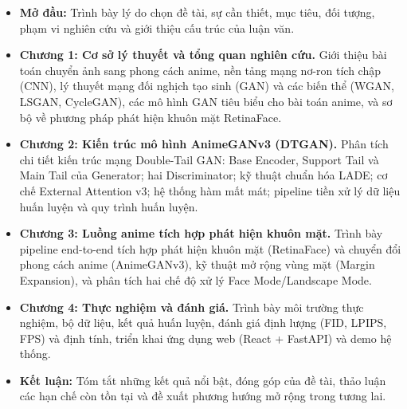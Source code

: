 \begin{itemize}
    \item \textbf{Mở đầu:} Trình bày lý do chọn đề tài, sự cần thiết, mục tiêu, đối tượng, phạm vi nghiên cứu và giới thiệu cấu trúc của luận văn.
    \item \textbf{Chương 1: Cơ sở lý thuyết và tổng quan nghiên cứu.} Giới thiệu bài toán chuyển ảnh sang phong cách anime, nền tảng mạng nơ-ron tích chập (CNN), lý thuyết mạng đối nghịch tạo sinh (GAN) và các biến thể (WGAN, LSGAN, CycleGAN), các mô hình GAN tiêu biểu cho bài toán anime, và sơ bộ về phương pháp phát hiện khuôn mặt RetinaFace.
    \item \textbf{Chương 2: Kiến trúc mô hình AnimeGANv3 (DTGAN).} Phân tích chi tiết kiến trúc mạng Double-Tail GAN: Base Encoder, Support Tail và Main Tail của Generator; hai Discriminator; kỹ thuật chuẩn hóa LADE; cơ chế External Attention v3; hệ thống hàm mất mát; pipeline tiền xử lý dữ liệu huấn luyện và quy trình huấn luyện.
    \item \textbf{Chương 3: Luồng anime tích hợp phát hiện khuôn mặt.} Trình bày pipeline end-to-end tích hợp phát hiện khuôn mặt (RetinaFace) và chuyển đổi phong cách anime (AnimeGANv3), kỹ thuật mở rộng vùng mặt (Margin Expansion), và phân tích hai chế độ xử lý Face Mode/Landscape Mode.
    \item \textbf{Chương 4: Thực nghiệm và đánh giá.} Trình bày môi trường thực nghiệm, bộ dữ liệu, kết quả huấn luyện, đánh giá định lượng (FID, LPIPS, FPS) và định tính, triển khai ứng dụng web (React + FastAPI) và demo hệ thống.
    \item \textbf{Kết luận:} Tóm tắt những kết quả nổi bật, đóng góp của đề tài, thảo luận các hạn chế còn tồn tại và đề xuất phương hướng mở rộng trong tương lai.
\end{itemize}
